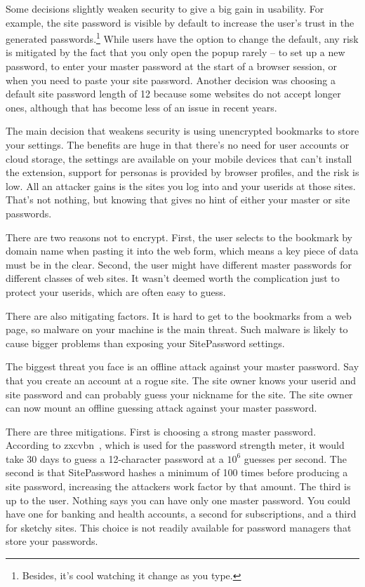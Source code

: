 Some decisions slightly weaken security to give a big gain in usability.  For example, the site password is visible by default to increase the user's trust in the generated passwords.\footnote{Besides, it's cool watching it change as you type.}  While users have the option to change the default, any risk is mitigated by the fact that you only open the popup rarely -- to set up a new password, to enter your master password at the start of a browser session, or when you need to paste your site password.  Another decision was choosing a default site password length of 12 because some websites do not accept longer ones, although that has become less of an issue in recent years. 

The main decision that weakens security is using unencrypted bookmarks to store your settings.   The benefits are huge in that there's no need for user accounts or cloud storage, the settings are available on your mobile devices that can't install the extension, support for personas is provided by browser profiles, and the risk is low.  All an attacker gains is the sites you log into and your userids at those sites.  That's not nothing, but knowing that gives no hint of either your master or site passwords.

There are two reasons not to encrypt.  First, the user selects to the bookmark by domain name when pasting it into the web form, which means a key piece of data must be in the clear.  Second, the user might have different master passwords for different classes of web sites.  It wasn't deemed worth the complication just to protect your userids, which are often easy to guess.

There are also mitigating factors.  It is hard to get to the bookmarks from a web page, so malware on your machine is the main threat.  Such malware is likely to cause bigger problems than exposing your SitePassword settings.

The biggest threat you face is an offline attack against your master password.  Say that you create an account at a rogue site.  The site owner knows your userid and site password and can probably guess your nickname for the site.  The site owner can now mount an offline guessing attack against your master password.

There are three mitigations.  First is choosing a strong master password.  According to zxcvbn~\cite{zxcvbn}, which is used for the password strength meter, it would take 30 days to guess a 12-character password at a $10^6$ guesses per second.  The second is that SitePassword hashes a minimum of 100 times before producing a site password, increasing the attackers work factor by that amount.  The third is up to the user.  Nothing says you can have only one master password.  You could have one for banking and health accounts, a second for subscriptions, and a third for sketchy sites.  This choice is not readily available for password managers that store your passwords. 

